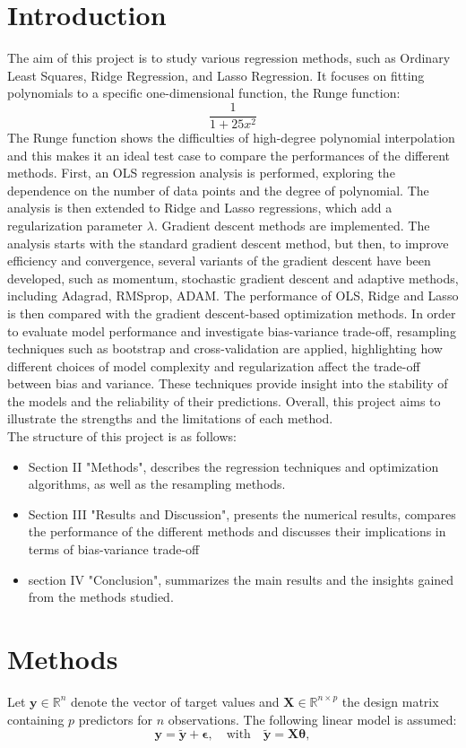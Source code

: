 \documentclass[%
 reprint,            %
 amsmath,amssymb,
 aps,
]{revtex4-2}
\begin{document}
\section{Introduction}
The aim of this project is to study various regression methods, such as Ordinary Least Squares, Ridge Regression, and Lasso Regression. It focuses on fitting polynomials to a specific one-dimensional function, the Runge function:
\[
\frac{1}{1+25x^2}
\]
The Runge function shows the difficulties of high-degree polynomial interpolation and this makes it an ideal test case to compare the performances of the different methods.
First, an OLS regression analysis is performed, exploring the dependence on the number of data points and the degree of polynomial. The analysis is then extended to Ridge and Lasso regressions, which add a regularization parameter ${\lambda}$. Gradient descent methods are implemented. The analysis starts with the standard gradient descent method, but then, to improve efficiency and convergence, several variants of the gradient descent have been developed, such as momentum, stochastic gradient descent and adaptive methods, including Adagrad, RMSprop, ADAM. The performance of OLS, Ridge and Lasso is then compared with the gradient descent-based optimization methods. In order to evaluate model performance and investigate bias-variance trade-off, resampling techniques such as bootstrap and cross-validation are applied, highlighting how different choices of model complexity and regularization affect the trade-off between bias and variance. These techniques provide insight into the stability of the models and the reliability of their predictions. 
Overall, this project aims to illustrate the strengths and the limitations of each method.\\
The structure of this project is as follows: 
\begin{itemize}
    \item Section II "Methods", describes the regression techniques and optimization algorithms, as well as the resampling methods.
    \item Section III "Results and Discussion", presents the numerical results, compares the performance of the different methods and discusses their implications in terms of bias-variance trade-off
    \item section IV "Conclusion", summarizes the main results and the insights gained from the methods studied.
\end{itemize}


\section{Methods}
 Let $\mathbf{y} \in \mathbb{R}^n$ denote the vector of target values and $\mathbf{X} \in \mathbb{R}^{n \times p}$ the design matrix containing $p$ predictors for $n$ observations. The following linear model is assumed:
$$
\mathbf{y} = \tilde{\mathbf{y}} + \boldsymbol{\epsilon}, \quad \text{with} \quad \tilde{\mathbf{y}} = \mathbf{X}\boldsymbol{\theta},
$$
\end{document}
